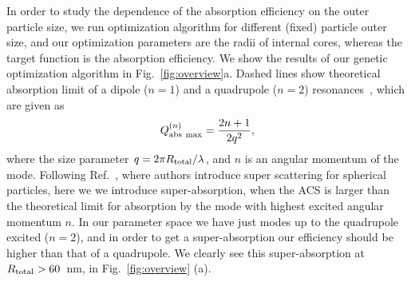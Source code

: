 \documentclass[aps,prl,twocolumn,showpacs,superscriptaddress,groupedaddress]{revtex4-1}
\begin{document}
\begin{figure}
\end{figure}
%
In order to study the dependence of the absorption efficiency on the
outer particle size, we run optimization algorithm for different
(fixed) particle outer size, and our optimization parameters are the
radii of internal cores, whereas the target function is the absorption
efficiency.  We show the results of our genetic optimization algorithm
in Fig.~\ref{fig:overview}a.  Dashed lines show theoretical absorption
limit of a dipole ($n=1$) and a quadrupole ($n=2$)
resonances~\cite{Tribelsky-2011}, which are given as $$Q^{(n)}_{\rm abs\
  max}=\frac{2n+1}{2q^2},$$ where the size parameter $q=2\pi R_{\rm
  total}/\lambda$, and $n$ is an angular momentum of the
mode. Following Ref.~\cite{Fan-2011}, where authors introduce super
scattering for spherical particles, here we we introduce
super-absorption, when the ACS is larger than the theoretical limit
for absorption by the mode with highest excited angular momentum
$n$. In our parameter space we have just modes up to the quadrupole
excited ($n=2$), and in order to get a super-absorption our efficiency
should be higher than that of a quadrupole. We clearly see this
super-absorption at $R_{\rm total}>60$~nm, in Fig.~\ref{fig:overview}
(a).
\end{document}
